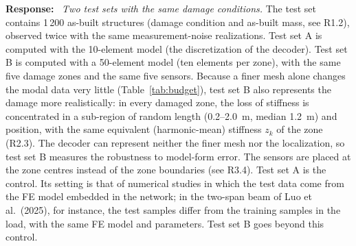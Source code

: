\documentclass[11pt]{article}
\newenvironment{response}{\par\smallskip\noindent\color{resp}\textbf{Response:}\ }{\par}
\begin{document}
\begin{response}
\textit{Two test sets with the same damage conditions.} The test set contains 1\,200 as-built structures (damage
condition and as-built mass, see R1.2), observed twice with the same measurement-noise realizations. Test set A is
computed with the 10-element model (the discretization of the decoder). Test set B is computed with a 50-element model
(ten elements per zone), with the same five damage zones and the same five sensors. Because a finer mesh alone changes
the modal data very little (Table~\ref{tab:budget}), test set B also represents the damage more realistically: in every
damaged zone, the loss of stiffness is concentrated in a sub-region of random length (0.2--2.0~m, median 1.2~m) and
position, with the same equivalent (harmonic-mean) stiffness $z_k$ of the zone (R2.3). The decoder can represent
neither the finer mesh nor the localization, so test set B measures the robustness to model-form error. The sensors are
placed at the zone centres instead of the zone boundaries (see R3.4). Test set A is the control. Its setting is that of
numerical studies in which the test data come from the FE model embedded in the network; in the two-span beam of Luo et al.\
(2025), for instance, the test samples differ from the training samples in the load, with the same FE model and parameters.
Test set B goes beyond this control.


\end{response}
\end{document}
